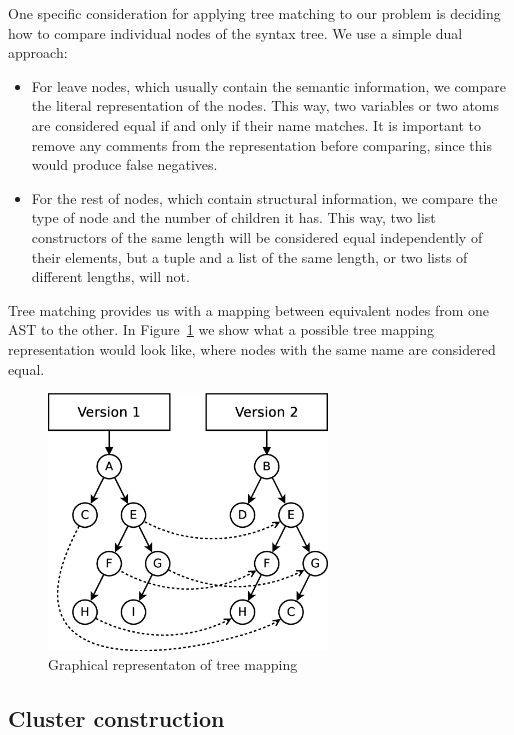 One specific consideration for applying tree matching to our problem is
deciding how to compare individual nodes of the syntax tree. We use
a simple dual approach:
\begin{itemize}
\item For leave nodes, which usually contain the semantic information, we
compare the literal representation of the nodes. This way, two variables
or two atoms are considered equal if and only if their name matches.
It is important to remove any comments from the representation before
comparing, since this would produce false negatives.
\item For the rest of nodes, which contain structural information, we compare
the type of node and the number of children it has. This way, two
list constructors of the same length will be considered equal independently
of their elements, but a tuple and a list of the same length, or two
lists of different lengths, will not.
\end{itemize}
Tree matching provides us with a mapping between equivalent nodes
from one AST to the other. In Figure~\ref{fig:tree-mapping-example}
we show what a possible tree mapping representation would look like,
where nodes with the same name are considered equal.

\begin{figure}
\centering
\includegraphics[width=0.66\textwidth]{figures/automatic_beh_inf/diagrams/dia2}
\par

\caption{Graphical representaton of tree mapping\label{fig:tree-mapping-example}}
\end{figure}



\subsection{Cluster construction}

